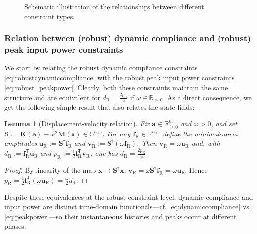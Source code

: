 \documentclass[preprint,3p]{elsarticle}
\newtheorem{lemma}{Lemma}
\newcommand{\T}{^{\mathsf T}}
\newcommand{\nel}{n_\mathrm{e}}
\newcommand{\ndof}{n_\mathrm{dof}}
\newcommand{\R}{\mathrm{R}}
\numberwithin{equation}{section}
\begin{document}
\begin{figure}[!htbp]
{}
  \caption{Schematic illustration of the relationships between different constraint types.}
  \label{fig:constraint_relationships}
\end{figure}

\subsubsection{Relation between (robust) dynamic compliance and (robust) peak input power constraints}

We start by relating the robust dynamic compliance constraints \eqref{eq:robustdynamiccompliance} with the robust peak input power constraints \eqref{eq:robust_peakpower}. Clearly, both these constraints maintain the same structure and are equivalent for $\overline{d}_\R = \frac{2\overline{p}_\R}{\omega}$ if $\omega\in \mathbb{R}_{>0}$. As a direct consequence, we get the following simple result that also relates the state fields:
%
\begin{lemma}[Displacement-velocity relation]\label{lemma:displacement_velocity}
  Fix $\mathbf a\in\mathbb R_{\ge0}^{\nel}$ and $\omega>0$, and set $\mathbf S:=\mathbf K(\mathbf a)-\omega^2\mathbf M(\mathbf a)\in\mathbb S^{\ndof}$. For any $\mathbf{f}_\R \in\mathbb R^{\ndof}$ define the minimal-norm amplitudes $\mathbf{u}_\R := \mathbf{S}^\dagger \mathbf{f}_\R$ and $\mathbf{v}_\R:=\mathbf{S}^\dagger(\omega \mathbf{f}_\R)$. Then $\mathbf{v}_\R=\omega \mathbf{u}_\R$ and, with $d_\R:=\mathbf{f}_\R\T \mathbf{u}_\R$ and $p_\R:=\frac{1}{2} \mathbf{f}_\R\T \mathbf{v}_\R$, one has $d_\R=\frac{2p_\R}{\omega}$.
\end{lemma}
\begin{proof}
  By linearity of the map $\mathbf{x} \mapsto \mathbf{S}^\dagger \mathbf{x}$, $\mathbf{v}_\R=\omega \mathbf{S}^\dagger \mathbf{f}_\R=\omega \mathbf{u}_\R$. Hence $p_\R=\frac{1}{2} \mathbf{f}_\R\T(\omega \mathbf{u}_\R) = \frac{\omega}{2} d_\R$.
\end{proof}
%
Despite these equivalences at the robust-constraint level, dynamic compliance and input power are distinct time-domain functionals---cf. \eqref{eq:dynamiccompliance} vs. \eqref{eq:peakpower}---so their instantaneous histories and peaks occur at different phases.
\end{document}
